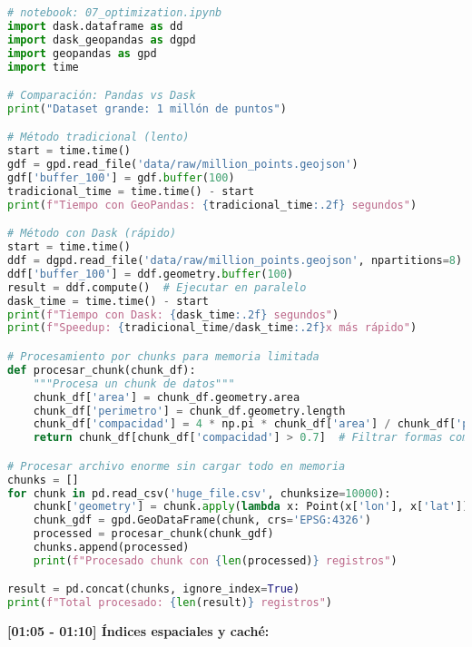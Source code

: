\documentclass[11pt,a4paper]{article}
\begin{document}
\begin{lstlisting}[language=Python]
# notebook: 07_optimization.ipynb
import dask.dataframe as dd
import dask_geopandas as dgpd
import geopandas as gpd
import time

# Comparación: Pandas vs Dask
print("Dataset grande: 1 millón de puntos")

# Método tradicional (lento)
start = time.time()
gdf = gpd.read_file('data/raw/million_points.geojson')
gdf['buffer_100'] = gdf.buffer(100)
tradicional_time = time.time() - start
print(f"Tiempo con GeoPandas: {tradicional_time:.2f} segundos")

# Método con Dask (rápido)
start = time.time()
ddf = dgpd.read_file('data/raw/million_points.geojson', npartitions=8)
ddf['buffer_100'] = ddf.geometry.buffer(100)
result = ddf.compute()  # Ejecutar en paralelo
dask_time = time.time() - start
print(f"Tiempo con Dask: {dask_time:.2f} segundos")
print(f"Speedup: {tradicional_time/dask_time:.2f}x más rápido")

# Procesamiento por chunks para memoria limitada
def procesar_chunk(chunk_df):
    """Procesa un chunk de datos"""
    chunk_df['area'] = chunk_df.geometry.area
    chunk_df['perimetro'] = chunk_df.geometry.length
    chunk_df['compacidad'] = 4 * np.pi * chunk_df['area'] / chunk_df['perimetro']**2
    return chunk_df[chunk_df['compacidad'] > 0.7]  # Filtrar formas compactas

# Procesar archivo enorme sin cargar todo en memoria
chunks = []
for chunk in pd.read_csv('huge_file.csv', chunksize=10000):
    chunk['geometry'] = chunk.apply(lambda x: Point(x['lon'], x['lat']), axis=1)
    chunk_gdf = gpd.GeoDataFrame(chunk, crs='EPSG:4326')
    processed = procesar_chunk(chunk_gdf)
    chunks.append(processed)
    print(f"Procesado chunk con {len(processed)} registros")

result = pd.concat(chunks, ignore_index=True)
print(f"Total procesado: {len(result)} registros")
\end{lstlisting}

\textbf{[01:05 - 01:10] Índices espaciales y caché:}
\end{document}
